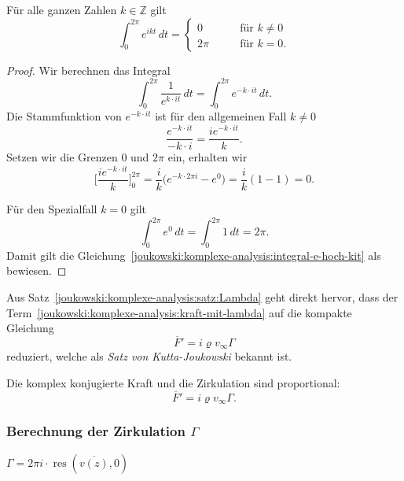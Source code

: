 \begin{lemma}
	\label{joukowski:lemma:inteikt}
	Für alle ganzen Zahlen $k\in\mathbb{Z}$ gilt
	\[
	\int_0^{2\pi} e^{ikt}\,dt
	=
	\begin{cases}
		0 & \qquad\text{für $k\ne 0$} \\
		2\pi&\qquad\text{für $k=0$}.
	\end{cases}
	\]
\end{lemma}

\begin{proof}
	\label{joukowski:komplexe-analysis:proof:integral-e-hoch-kit}
	Wir berechnen das Integral
	\[
		\int_{0}^{2\pi}
		\frac{1}{e^{k \cdot i t}}
		\, dt
		=
		\int_{0}^{2\pi}
		e^{-k \cdot i t}
		\, dt.
	\]
	Die Stammfunktion von
	\(
		e^{-k \cdot i t}
	\)
	ist für den allgemeinen Fall $k \neq 0$
	\[
		\frac{e^{-k \cdot i t}}{-k \cdot i}
		=
		\frac{i e^{-k \cdot i t}}{k}.
	\]
	Setzen wir die Grenzen $0$ und $2\pi$ ein, erhalten wir
	\[
		\biggl[\frac{i e^{-k \cdot i t}}{k}\biggr]_{0}^{2\pi}
		=
		\frac{i}{k} \bigl(e^{-k \cdot 2\pi i} - e^{0}\bigr)
		=
		\frac{i}{k} (1 - 1)
		=
		0.
	\]
	
	Für den Spezialfall $k = 0$ gilt
	\[
		\int_{0}^{2\pi}
		e^{0}
		\, dt
		=
		\int_{0}^{2\pi}
		1
		\, dt
		=
		2\pi.
	\]
	Damit gilt die Gleichung~\eqref{joukowski:komplexe-analysis:integral-e-hoch-kit} als bewiesen.
\end{proof}

Aus Satz~\ref{joukowski:komplexe-analysis:satz:Lambda} geht direkt hervor,
dass der Term~\eqref{joukowski:komplexe-analysis:kraft-mit-lambda} auf die kompakte Gleichung
\[
	\overline{F}'
	=
	i \varrho v_\infty \Gamma
\]
reduziert,
welche als \emph{Satz von Kutta-Joukowski} bekannt ist.
%

\begin{satz}
	\label{joukowski:komplexe-analysis:satz:kutta-joukowski}
	Die komplex konjugierte Kraft und die Zirkulation sind proportional:
	\[
	\overline{F}'
	=
	i \varrho v_\infty \Gamma.
	\]
\end{satz}



\subsubsection{Berechnung der Zirkulation $\Gamma$}
\begin{satz}
	\label{joukowski:komplexe-analysis:satz:zirkulation}
	$\Gamma = 2\pi i \cdot \operatorname{res}(\overline{v(z)}, 0)$
\end{satz}

